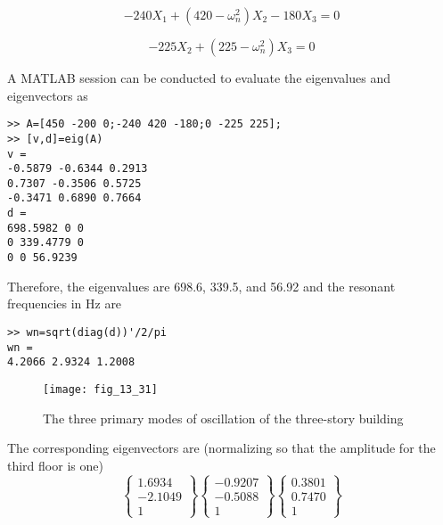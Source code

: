 \documentclass[../main.tex]{subfiles}
\begin{document}
\begin{equation}
-240X_{1}+\left ( 420-\omega^{2}_{n} \right )X_{2}-180X_{3}=0
\end{equation}

\begin{equation}
-225X_{2}+\left (225-\omega^{2}_{n} \right )X_{3}=0
\end{equation}

A MATLAB session can be conducted to evaluate the eigenvalues and eigenvectors as

\begin{lstlisting}[numbers=none]
>> A=[450 -200 0;-240 420 -180;0 -225 225];
>> [v,d]=eig(A)
v =
-0.5879 -0.6344 0.2913
0.7307 -0.3506 0.5725
-0.3471 0.6890 0.7664
d =
698.5982 0 0
0 339.4779 0
0 0 56.9239
\end{lstlisting}

Therefore, the eigenvalues are 698.6, 339.5, and 56.92 and the resonant frequencies in
Hz are
\begin{lstlisting}[numbers=none]
>> wn=sqrt(diag(d))'/2/pi
wn =
4.2066 2.9324 1.2008
\end{lstlisting}

\begin{figure}[H]
		\centering
		\texttt{[image: fig\_13\_31]}
	   \caption{\textsf{The three primary modes of oscillation of the three-story building}}
	   \label{fig:fig_13_31}
\end{figure}

The corresponding eigenvectors are (normalizing so that the amplitude for the third floor is one)
\begin{equation}
\begin{Bmatrix}
1.6934\\
-2.1049\\
1
\end{Bmatrix}
\begin{Bmatrix}
-0.9207\\
-0.5088\\
1
\end{Bmatrix}
\begin{Bmatrix}
0.3801\\
0.7470\\
1 \end{Bmatrix}
\end{equation}
\end{document}
